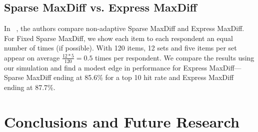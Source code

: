 \documentclass[nonblindrev]{informs3}
\begin{document}

\subsection{Sparse MaxDiff vs. Express MaxDiff}
In ~\cite{wirth2012largeset}, the authors compare non-adaptive Sparse MaxDiff and Express MaxDiff. For Fixed Sparse MaxDiff, we show each item to each respondent an equal number of times (if possible). With 120 items, 12 sets and five items per set appear on average $\frac{12*5}{120} = 0.5$ times per respondent. We compare the results using our simulation and find a modest edge in performance for Express MaxDiff---Sparse MaxDiff ending at 85.6\% for a top 10 hit rate and Express MaxDiff ending at 87.7\%.

\section{Conclusions and Future Research}
\end{document}
